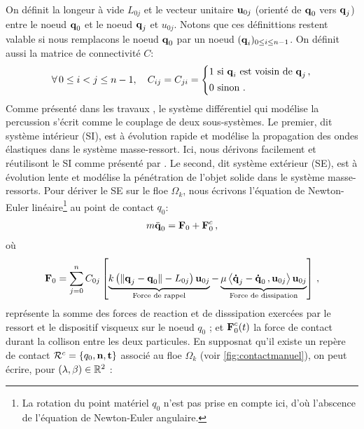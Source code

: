 \noindent On définit la longeur à vide $L_{0j}$ et le vecteur unitaire $\bm{\mathrm{u}}_{0j}$ (orienté de $\bm{\mathrm{q}}_0$ vers $\bm{\mathrm{q}}_j$) entre le noeud $\bm{\mathrm{q}}_0$ et le noeud $\bm{\mathrm{q}}_j$ et $u_{0j}$. Notons que ces définittions restent valable si nous remplacons le noeud $\bm{\mathrm{q}}_0$ par un noeud $(\bm{\mathrm{q}}_i)_{0 \leq i \leq n-1}$. On définit aussi la matrice de connectivité $C$:
\begin{align*}
    \forall \, 0 \leq i < j \leq n-1, \quad C_{ij} = C_{ji} = \begin{dcases}
    1 \text{ si } \bm{\mathrm{q}}_i \text{ est voisin de } \bm{\mathrm{q}}_j \,, \\
    0 \text{ sinon }.
\end{dcases}
\end{align*}
\noindent Comme présenté dans les travaux \parencite[p.186]{balasoiu2020halthesis}, le système différentiel qui modélise la percussion s’écrit comme le couplage de deux sous-systèmes. Le premier, dit système intérieur (SI), est à évolution rapide et modélise la propagation des ondes élastiques dans le système masse-ressort. Ici, nous dérivons facilement et réutilisont le SI comme présenté par \citeauthor{balasoiu2020halthesis}. Le second, dit système extérieur (SE), est à évolution lente et modélise la pénétration de l’objet solide dans le système masse-ressorts. Pour dériver le SE sur le floe $\Omega_k$, nous écrivons l'équation de Newton-Euler linéaire\footnote{La rotation du point matériel $q_0$ n'est pas prise en compte ici, d'où l'abscence de l'équation de Newton-Euler angulaire.} au point de contact $q_0$:
\begin{align}  \label{eq:SE}
m \ddot{\bm{\mathrm{q}}}_0 = \bm{\mathrm{F}}_0 + \bm{\mathrm{F}}^c_0 \,,
\end{align}
où 
\begin{align}  \label{eq:F0}
    \bm{\mathrm{F}}_0 = \sum_{j=0}^{n}C_{0j} \left[  \underbrace{k \left( \Vert \bm{\mathrm{q}}_j - \bm{\mathrm{q}}_0 \Vert - L_{0j} \right) \bm{\mathrm{u}}_{0j}}_{\text{Force de rappel}} - \underbrace{\mu \left\langle \bm{\mathrm{\dot{q}}}_j - \bm{\mathrm{\dot{q}}}_0\,, \bm{\mathrm{u}}_{0j}  \right\rangle  \bm{\mathrm{u}}_{0j}}_{\text{Force de dissipation}}  \right] \,,
\end{align}
représente la somme des forces de reaction et de disssipation exercées par le ressort et le dispositif visqueux sur le noeud $q_0$ ; et $\bm{\mathrm{F}}^c_0(t)$ la force de contact durant la collison entre les deux particules. En supposnat qu'il existe un repère de contact $\mathcal{R}^c = \{ q_0, \bm{\mathrm{n}}, \bm{\mathrm{t}} \}$ associé au floe $\Omega_k$ (voir \cref{fig:contactmanuel}), on peut écrire, pour $(\lambda, \beta) \in \mathbb{R}^2$ :
